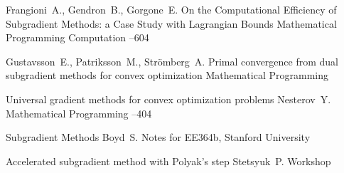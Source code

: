 \documentclass[10pt,twoside,book,a5paper]{ncc}
\begin{document}
\begin{thebibliography}{99}

\by Frangioni~A., Gendron~B., Gorgone~E. 
\paper On the Computational Efficiency of Subgradient Methods: a Case Study with Lagrangian Bounds
\jour Mathematical Programming Computation
–604

\by Gustavsson~E., Patriksson~M., Strömberg~A.
\paper Primal convergence from dual subgradient methods for convex optimization
\jour Mathematical Programming

\paper Universal gradient methods for convex optimization problems
\by Nesterov~Y.
\jour Mathematical Programming
--404

\paper Subgradient Methods
\by Boyd~S.
\jour  Notes for EE364b, Stanford University

\paper Accelerated subgradient method with Polyak's step
\by Stetsyuk~P.
\jour Workshop

\end{thebibliography}

\section*{}
\end{document}
